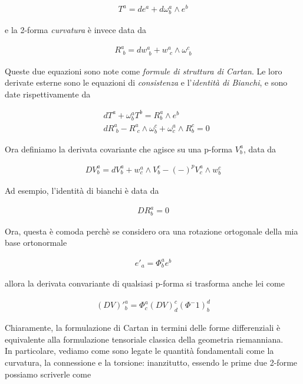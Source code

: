 \documentclass{report}
\begin{document}
\begin{align}
    T^a = de^a + d\omega^a_b \wedge e^b
\end{align}

e la 2-forma \emph{curvatura} è invece data da 

\begin{align}
    R^a_{\,\, b} = dw^a_{\,\, b} + w^a_{\,\, c} \wedge \omega^c_{\,\, b}
\end{align}

Queste due equazioni sono note come \emph{formule di struttura di Cartan}. Le loro derivate esterne sono le equazioni di \emph{consistenza} e l'\emph{identità di Bianchi}, e sono date rispettivamente da 

\begin{align}
    &dT^a + \omega^a_b T^b = R^a_b \wedge e^b \\
    &dR^a_{\,\, b} -R^a_{\, \, c}\wedge \omega^c_b + \omega^a_c \wedge R^c_b= 0 
\end{align}

Ora definiamo la derivata covariante che agisce su una p-forma \(V^a_b\), data da 

\begin{align}
    D V^a_b = dV^a_b + w^a_c \wedge V^c_b - (-)^p V^a_c \wedge w^c_b  
\end{align}

Ad esempio, l'identità di bianchi è data da 

\begin{align}
    D R^a_b = 0
\end{align}

Ora, questa è comoda perchè se considero ora una rotazione ortogonale della mia base ortonormale

\begin{align}
    e'_a = \Phi^a_b e^b
\end{align}

allora la derivata convariante di qualsiasi p-forma si trasforma anche lei come 

\begin{align}
    (DV)'^a_b = \Phi^a_c (DV)^c_d (\Phi^-1)^d_b
\end{align}

Chiaramente, la formulazione di Cartan in termini delle forme differenziali è equivalente alla formulazione tensoriale classica della geometria riemanniana. \\

In particolare, vediamo come sono legate le quantità fondamentali come la curvatura, la connessione e la torsione: inanzitutto, essendo le prime due 2-forme possiamo scriverle come 
\end{document}
